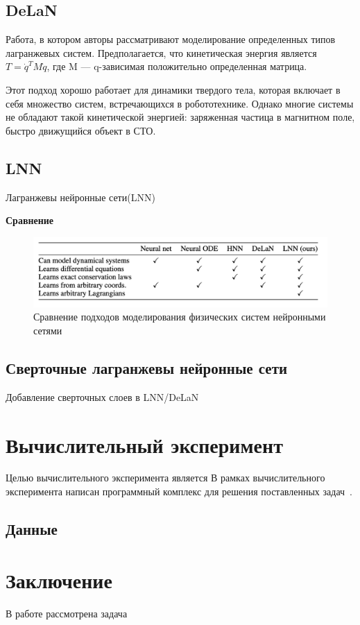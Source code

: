 \documentclass[12pt]{article}
\begin{document}
	
	\subsection{DeLaN}
	Работа, в котором авторы рассматривают моделирование определенных типов лагранжевых систем. Предполагается, что кинетическая энергия является $T = \dot{q}^TM\dot{q}$, где M — q-зависимая положительно определенная матрица. 
	
	Этот подход хорошо работает для динамики твердого тела, которая включает в себя множество систем, встречающихся в робототехнике. Однако многие системы не обладают такой кинетической энергией: заряженная частица в магнитном поле, быстро движущийся объект в СТО.
	
	\subsection{LNN}
	Лагранжевы нейронные сети(LNN)
	
	\textbf{Сравнение}
		\begin{figure}[h]
			\centering
			\includegraphics[width=1.05\textwidth]{comparison.png}
			\caption{Сравнение подходов моделирования физических систем нейронными сетями}
		\end{figure}
	
	
	\subsection{Сверточные лагранжевы нейронные сети}
	Добавление сверточных слоев в LNN/DeLaN
	
	\section{Вычислительный эксперимент}
	Целью вычислительного эксперимента является 
	В рамках вычислительного эксперимента написан программный комплекс для решения поставленных задач~\cite{source_code}.
	
	\subsection{Данные}
	


	\section{Заключение}
	В работе рассмотрена задача 
	
	
	

		
	
	
\end{document}
